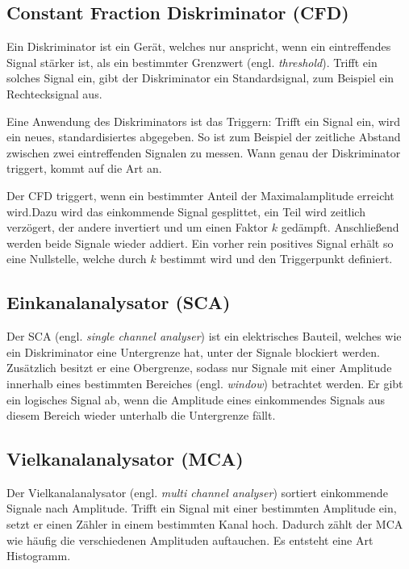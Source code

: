 \subsection{Constant Fraction Diskriminator (CFD)}

Ein Diskriminator ist ein Gerät, welches nur anspricht, wenn ein eintreffendes
Signal stärker ist, als ein bestimmter Grenzwert (engl. \emph{threshold}).
Trifft ein solches Signal ein, gibt der Diskriminator ein Standardsignal, zum
Beispiel ein Rechtecksignal aus.

Eine Anwendung des Diskriminators ist das Triggern: Trifft ein Signal ein, wird
ein neues, standardisiertes abgegeben. So ist zum Beispiel der zeitliche
Abstand zwischen zwei eintreffenden Signalen zu messen. Wann genau der
Diskriminator triggert, kommt auf die Art an.

Der CFD triggert, wenn ein bestimmter Anteil der Maximalamplitude erreicht
wird.Dazu wird das einkommende Signal gesplittet, ein Teil wird zeitlich
verzögert, der andere invertiert und um einen Faktor $k$ gedämpft. Anschließend
werden beide Signale wieder addiert. Ein vorher rein positives Signal erhält so
eine Nullstelle, welche durch $k$ bestimmt wird und den Triggerpunkt definiert.

\subsection{Einkanalanalysator (SCA)}

Der SCA (engl. \emph{single channel analyser}) ist ein elektrisches Bauteil,
welches wie ein Diskriminator eine Untergrenze hat, unter der Signale blockiert
werden. Zusätzlich besitzt er eine Obergrenze, sodass nur Signale mit einer
Amplitude innerhalb eines bestimmten Bereiches (engl. \emph{window}) betrachtet
werden. Er gibt ein logisches Signal ab, wenn die Amplitude eines einkommendes
Signals aus diesem Bereich wieder unterhalb die Untergrenze fällt.

\subsection{Vielkanalanalysator (MCA)}

Der Vielkanalanalysator (engl. \emph{multi channel analyser}) sortiert
einkommende Signale nach Amplitude. Trifft ein Signal mit einer bestimmten
Amplitude ein, setzt er einen Zähler in einem bestimmten Kanal hoch. Dadurch
zählt der MCA wie häufig die verschiedenen Amplituden auftauchen. Es entsteht
eine Art Histogramm.

